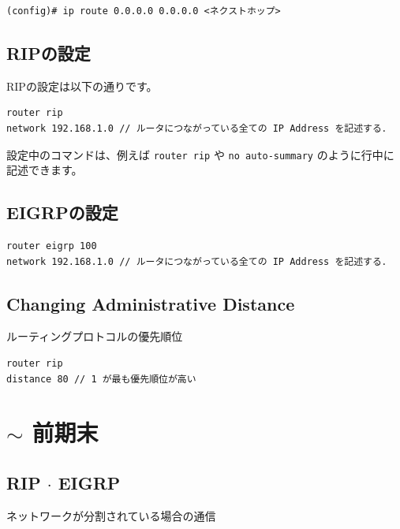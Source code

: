 \documentclass[uplatex,dvipdfmx]{bxjsarticle}
\begin{document}
\begin{lstlisting}[caption={デフォルトルートの設定}]
(config)# ip route 0.0.0.0 0.0.0.0 <ネクストホップ>

\end{lstlisting}

\subsection{RIPの設定}

RIPの設定は以下の通りです。

\begin{lstlisting}[caption=RIP Settings,label=rip_def]
router rip
network 192.168.1.0 // ルータにつながっている全ての IP Address を記述する．
\end{lstlisting}

設定中のコマンドは、例えば \texttt{router rip} や \texttt{no auto-summary} のように行中に記述できます。

\subsection{EIGRPの設定}

\begin{lstlisting}[caption=EIGRP Settings,label=eigrp_def]
router eigrp 100
network 192.168.1.0 // ルータにつながっている全ての IP Address を記述する．
\end{lstlisting}

\subsection{Changing Administrative Distance}

ルーティングプロトコルの優先順位

\begin{lstlisting}[caption=Changing Administrative Distance]
router rip
distance 80 // 1 が最も優先順位が高い
\end{lstlisting}

\section{$\sim$ 前期末}

\subsection{RIP $\cdot$ EIGRP}

ネットワークが分割されている場合の通信
\end{document}
